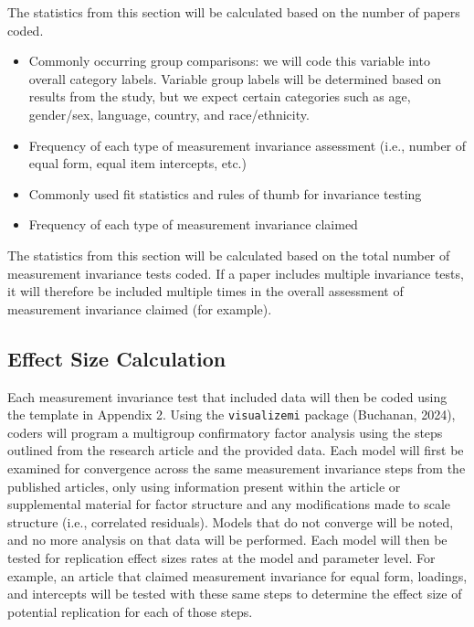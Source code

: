 \documentclass[
  english,
  man]{apa7}
\providecommand{\tightlist}{%
  \setlength{\itemsep}{0pt}\setlength{\parskip}{0pt}}
\begin{document}
The statistics from this section will be calculated based on the number of papers coded.

\begin{itemize}
\tightlist
\item
  Commonly occurring group comparisons: we will code this variable into overall category labels. Variable group labels will be determined based on results from the study, but we expect certain categories such as age, gender/sex, language, country, and race/ethnicity.
\item
  Frequency of each type of measurement invariance assessment (i.e., number of equal form, equal item intercepts, etc.)
\item
  Commonly used fit statistics and rules of thumb for invariance testing
\item
  Frequency of each type of measurement invariance claimed
\end{itemize}

The statistics from this section will be calculated based on the total number of measurement invariance tests coded. If a paper includes multiple invariance tests, it will therefore be included multiple times in the overall assessment of measurement invariance claimed (for example).

\subsection{Effect Size Calculation}\label{effect-size-calculation}

Each measurement invariance test that included data will then be coded using the template in Appendix 2. Using the \texttt{visualizemi} package (Buchanan, 2024), coders will program a multigroup confirmatory factor analysis using the steps outlined from the research article and the provided data. Each model will first be examined for convergence across the same measurement invariance steps from the published articles, only using information present within the article or supplemental material for factor structure and any modifications made to scale structure (i.e., correlated residuals). Models that do not converge will be noted, and no more analysis on that data will be performed. Each model will then be tested for replication effect sizes rates at the model and parameter level. For example, an article that claimed measurement invariance for equal form, loadings, and intercepts will be tested with these same steps to determine the effect size of potential replication for each of those steps.
\end{document}

